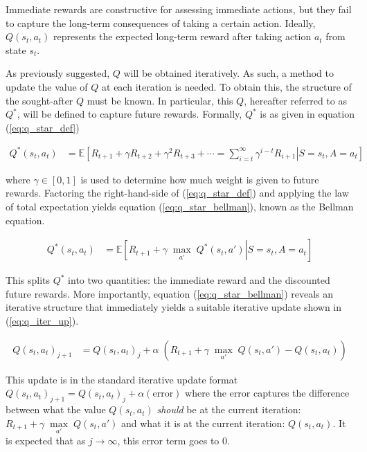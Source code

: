 \documentclass[12pt,letterpaper]{article}
\newcommand\E{\mathbb{E}}
\begin{document}
Immediate rewards are constructive for assessing immediate actions, but they fail
to capture the long-term consequences of taking a certain action. Ideally, 
$Q(s_t, a_t)$ represents the expected long-term reward after taking action $a_t$ from
state $s_t$. 

As previously suggested, $Q$ will be obtained iteratively. As such, a method
to update the value of $Q$ at each iteration is needed. To obtain this, the
structure of the sought-after $Q$ must be known. In particular, this $Q$, 
hereafter referred to as $Q^*$, will be defined to capture future rewards. 
Formally, $Q^*$ is as given in equation (\ref{eq:q_star_def})

\begin{align}\label{eq:q_star_def}
Q^*(s_t, a_t) &= \E\left.\left[R_{t+1} + \gamma R_{t+2} +
\gamma^2 R_{t+3} + \cdots = \sum_{i=t}^{\infty} \gamma^{i-t}R_{i+1}
\right|
S = s_t, A = a_t
\right]
\end{align}

where $\gamma \in [0,1]$ is used to determine how much weight is given to future 
rewards. Factoring the right-hand-side of (\ref{eq:q_star_def}) and applying 
the law of total expectation yields equation (\ref{eq:q_star_bellman}),
known as the Bellman equation.

\begin{align}\label{eq:q_star_bellman}
Q^*(s_t, a_t) &= \E\left.\left[R_{t+1} + \gamma \; \underset{a'}\max \; 
Q^*(s_t,a')\right|S = s_t, A = a_t\right]
\end{align}

This splits $Q^*$ into two quantities: the immediate reward and the discounted
future rewards. More importantly,
equation (\ref{eq:q_star_bellman}) reveals an iterative structure that 
immediately yields a suitable iterative update shown in (\ref{eq:q_iter_up}).

\begin{align}\label{eq:q_iter_up}
Q(s_t, a_t)_{j+1} &= Q(s_t, a_t)_j + \alpha \;
\left(R_{t+1} + \gamma \; \underset{a'}\max \; Q(s_t,a') - Q(s_t, a_t)\right)
\end{align}

This update is in the standard iterative update format
$Q(s_t, a_t)_{j+1} = Q(s_t, a_t)_j + \alpha(\textrm{error})$ where
the error captures the difference between what the value $Q(s_t, a_t)$ 
\textit{should} 
be at the current iteration: $R_{t+1} + \gamma \; \underset{a'}\max \; Q(s_t,a')$ 
and what it is at the current iteration: $Q(s_t, a_t)$. It is expected that
as $j \to \infty$, this error term goes to 0. 
\end{document}
